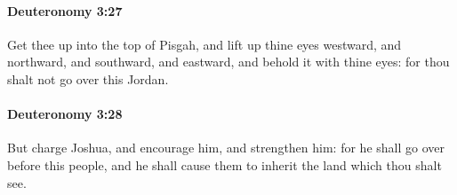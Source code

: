 		\paragraph{Deuteronomy 3:27} %
			\label{DEUTERONOMY-3-27}

			Get thee up into the top of Pisgah, and lift up thine eyes westward, and northward, and southward, and eastward, and behold it with thine eyes: for thou shalt not go over this Jordan.


		\paragraph{Deuteronomy 3:28} %
			\label{DEUTERONOMY-3-28}

			But charge Joshua, and encourage him, and strengthen him: for he shall go over before this people, and he shall cause them to inherit the land which thou shalt see.

